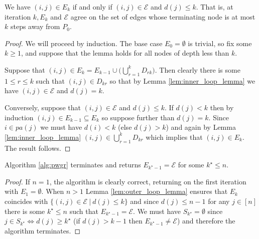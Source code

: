 \documentclass[12pt]{article}
\def\gcg{\mathcal{G}}  %
\def\gcge{\mathcal{E}}  %
\newcommand{\pa}[1]{pa(#1)}  %
\begin{document}
\begin{lemma}
  \label{lem:outer_loop_lemma}
  We have $(i, j) \in E_k$ if and only if $(i, j) \in \gcge$ and
  $d(j) \le k$.  That is, at iteration $k, E_k$ and $\gcge$ agree on
  the set of edges whose terminating node is at most $k$ steps away
  from $P_0$.
\end{lemma}
\begin{proof}
  We will proceed by induction.  The base case $E_0 = \emptyset$ is
  trivial, so fix some $k \ge 1$, and suppose that the lemma holds for
  all nodes of depth less than $k$.

  Suppose that
  $(i, j) \in E_k = E_{k - 1}\cup \big(\bigcup_{r = 1}^k D_{rk}
  \big)$.  Then clearly there is some $1 \le r \le k$ such that
  $(i, j) \in D_{kr}$ so that by Lemma \ref{lem:inner_loop_lemma} we
  have $(i, j) \in \gcge$ and $d(j) = k$.

  Conversely, suppose that $(i, j) \in \gcge$ and $d(j) \le k$.  If
  $d(j) < k$ then by induction $(i, j) \in E_{k - 1} \subseteq E_k$ so
  suppose further than $d(j) = k$.  Since $i \in \pa{j}$ we must have
  $d(i) < k$ (else $d(j) > k$) and again by Lemma
  \ref{lem:inner_loop_lemma} $(i, j) \in \bigcup_{r = 1}^k D_{kr}$
  which implies that $(i, j) \in E_k$.  The result follows.
\end{proof}

\begin{lemma}
  Algorithm \ref{alg:pwgr} terminates and returns $E_{k^\star - 1} = \gcge$
  for some $k^\star \le n$.
\end{lemma}
\begin{proof}
  If $n = 1$, the algorithm is clearly correct, returning on the first
  iteration with $E_1 = \emptyset$.  When $n > 1$ Lemma
  \ref{lem:outer_loop_lemma} ensures that $E_k$ coincides with
  $\{(i, j) \in \gcge\ |\ d(j) \le k\}$ and since $d(j) \le n - 1$ for
  any $j \in [n]$ there is some $k^\star \le n$ such that
  $E_{k^\star - 1} = \gcge$.  We must have $S_{k^\star} = \emptyset$
  since $j \in S_{k^\star} \iff d(j) \ge k^\star$ (if $d(j) > k - 1$ then
  $E_{k^\star - 1} \ne \gcge$) and therefore the algorithm terminates.
\end{proof}

\end{document}
